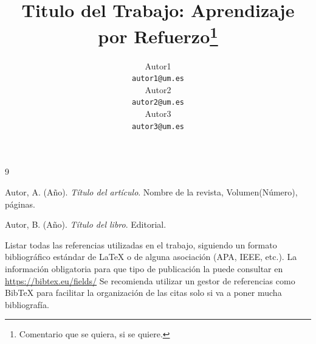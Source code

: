 \documentclass[a4paper, 10pt, twocolumn]{report}
\title{Titulo del Trabajo: Aprendizaje por Refuerzo\footnote{Comentario que se quiera, si se quiere.}}
\author{
Autor1 	\\
\texttt{autor1@um.es} \\[0.25cm]
Autor2 	\\
\texttt{autor2@um.es} \\[0.25cm]
Autor3 	\\
\texttt{autor3@um.es}}
\begin{document}
\maketitle %



\tableofcontents




\begin{thebibliography}{9} %
	\setlength{\itemsep}{0pt} %
  	\setlength{\parsep}{0pt}    %
  	
    Autor, A. (Año). \textit{Título del artículo}. Nombre de la revista, Volumen(Número), páginas.

    Autor, B. (Año). \textit{Título del libro}. Editorial.
    
\end{thebibliography}


Listar todas las referencias utilizadas en el trabajo, siguiendo un formato bibliográfico estándar de \LaTeX\/ o de alguna asociación (APA, IEEE, etc.). La información obligatoria para que tipo de publicación la puede consultar en \url{https://bibtex.eu/fields/} Se recomienda utilizar un gestor de referencias como Bib\TeX\/ para facilitar la organización de las citas solo si va a poner mucha bibliografía. 
\end{document}
